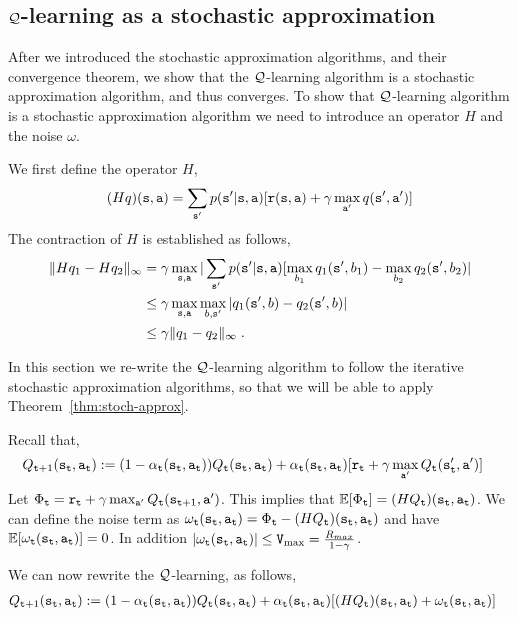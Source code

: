 \subsection{$\mathcal{Q}$-learning as a stochastic approximation}

After we introduced the stochastic approximation algorithms, and
their convergence theorem, we show that the $\mathcal{Q}$-learning algorithm
is a stochastic approximation algorithm, and thus converges.
%
To show that $\mathcal{Q}$-learning algorithm is a stochastic approximation
algorithm we need to introduce an operator $H$ and the noise
$\omega$.

We first define the operator $H$,
\[
(Hq)({\tt s},{\tt a})=\sum_{{\tt s}'}p({\tt s}'|{\tt s},{\tt a})
[{\tt r}({\tt s},{\tt a}) + \gamma \max_{{\tt a}'} q ({\tt s}',
{\tt a}')]
\]
The contraction of $H$ is established as follows,
\begin{align*}
\|Hq_1-Hq_2\|_\infty &= \gamma \max_{{\tt s},{\tt a}}
|\sum_{{\tt s}'} p({\tt s}'|{\tt s},{\tt a})
[\max_{b_1} q_1({\tt s}',b_1)-\max_{b_2} q_2({\tt s}',b_2)|\\
&\leq \gamma \max_{{\tt s},{\tt a}}\max_{b,{\tt s}'} |q_1({\tt s}',b)-q_2({\tt s}',b)|\\
&\leq \gamma \|q_1-q_2\|_\infty\;.
\end{align*}


In this section we re-write the $\mathcal{Q}$-learning algorithm to follow the
iterative stochastic approximation algorithms, so that we will be
able to apply Theorem~\ref{thm:stoch-approx}.

Recall that,
\begin{align*}
 Q_{{\tt t}+1}({\tt s}_{\tt t},{\tt a}_{\tt t}) & :=   (1-\alpha_{\tt t}({\tt s}_{\tt t},{\tt a}_{\tt t}) ) Q_{\tt t} ({\tt s}_{\tt t},{\tt a}_{\tt t}) + \alpha_{\tt t}({\tt s}_{\tt t},{\tt a}_{\tt t})  [{\tt r}_{\tt t} +
\gamma \max_{{\tt a}'} Q_{\tt t} ({\tt s}_{{\tt t}}',
{\tt a}')]
\end{align*}
Let $\Phi_{\tt t}={\tt r}_{\tt t} + \gamma \max_{{\tt a}'} Q_{\tt t}
({\tt s}_{{\tt t}+1}, {\tt a}')$. This implies that $\mathbb{E}[\Phi_{\tt t}]=
(HQ_{\tt t})({\tt s}_{\tt t},{\tt a}_{\tt t})$. We can define the noise
term as
$\omega_{\tt t}({\tt s}_{\tt t},{\tt a}_{\tt t})=\Phi_{\tt t}-(HQ_{\tt t})({\tt s}_{\tt t},{\tt a}_{\tt t})$
and have $\mathbb{E}[\omega_{\tt t}({\tt s}_{\tt t},{\tt a}_{\tt t})]=0$. In
addition $|\omega_{\tt t}({\tt s}_{\tt t},{\tt a}_{\tt t})|\leq {\tt V}_{\max }=
\frac{R_{max}}{1-\gamma}$.

We can now rewrite the $\mathcal{Q}$-learning, as follows,
\begin{align*}
 Q_{{\tt t}+1}({\tt s}_{\tt t},{\tt a}_{\tt t}) & :=   (1-\alpha_{\tt t}({\tt s}_{\tt t},{\tt a}_{\tt t}) ) Q_{\tt t} ({\tt s}_{\tt t},{\tt a}_{\tt t}) + \alpha_{\tt t}({\tt s}_{\tt t},{\tt a}_{\tt t})
 [(HQ_{\tt t})({\tt s}_{\tt t},{\tt a}_{\tt t})+\omega_{\tt t}({\tt s}_{\tt t},{\tt a}_{\tt t})]
\end{align*}


